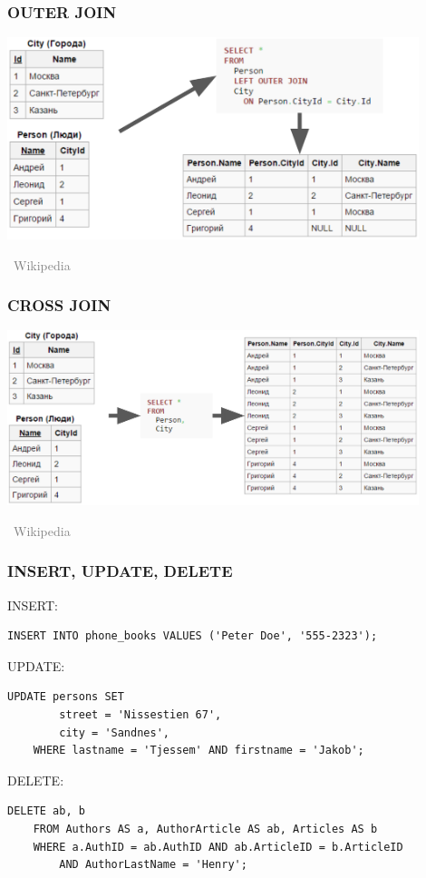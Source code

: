 \documentclass[xetex,mathserif,serif]{beamer}
\newcommand{\attribution}[1] {
\vspace{-5mm}\begin{flushright}\begin{scriptsize}\textcolor{gray}{\textcopyright\, #1}\end{scriptsize}\end{flushright}
}
\begin{document}
	\begin{frame}
		\frametitle{OUTER JOIN}
		\begin{center}
			\includegraphics[width=0.9\textwidth]{outerJoin.png}
			\attribution{Wikipedia}
		\end{center}
	\end{frame}

	\begin{frame}
		\frametitle{CROSS JOIN}
		\begin{center}
			\includegraphics[width=0.9\textwidth]{crossJoin.png}
			\attribution{Wikipedia}
		\end{center}
	\end{frame}

	\begin{frame}[fragile]
		\frametitle{INSERT, UPDATE, DELETE}
		\begin{small}
			INSERT:
			\begin{verbatim}
INSERT INTO phone_books VALUES ('Peter Doe', '555-2323');
			\end{verbatim}

			\vspace{3mm}
			UPDATE:
			\begin{verbatim}
UPDATE persons SET
        street = 'Nissestien 67',
        city = 'Sandnes',
    WHERE lastname = 'Tjessem' AND firstname = 'Jakob';
			\end{verbatim}

			\vspace{3mm}
			DELETE:
			\begin{verbatim}
DELETE ab, b
    FROM Authors AS a, AuthorArticle AS ab, Articles AS b
    WHERE a.AuthID = ab.AuthID AND ab.ArticleID = b.ArticleID
        AND AuthorLastName = 'Henry';
			\end{verbatim}
		\end{small}
	\end{frame}
\end{document}
